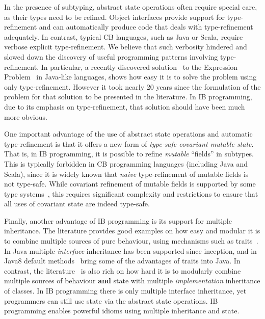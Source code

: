 In the presence of subtyping, abstract state operations often require
special care, as their types need to be refined. Object interfaces
provide support for type-refinement and can automatically produce code
that deals with type-refinement adequately. In contrast, typical CB
languages, such as Java or Scala, require verbose explicit
type-refinement. We believe that such verbosity hindered and slowed
down the discovery of useful programming patterns involving
type-refinement. In particular, a recently discovered
solution~\cite{eptrivially} to the Expression
Problem~\cite{wadler98expression} in Java-like languages, shows how easy it is to solve
the problem using only type-refinement. However it took nearly 20
years since the formulation of the problem for that
solution to be presented in the literature. In IB programming, due to
its emphasis on type-refinement, that solution should have been much
more obvious.

One important advantage of the use of abstract state operations and
automatic type-refinement is that it offers a new form of
\emph{type-safe covariant mutable state}. That is, in IB programming,
it is possible to refine \emph{mutable} ``fields'' in subtypes. This is
typically forbidden in CB programming languages (including Java and
Scala), since it is widely known that \emph{naive} type-refinement of
mutable fields is not type-safe. While covariant refinement of mutable
fields is supported by some type systems~\cite{bruce98astatically,McDirmid01jiazzi,ernst01family,ernst06virtual}, this requires
significant complexity and restrictions to ensure that all uses of
covariant state are indeed type-safe. 

\begin{comment}
\marcoT{%

In this paper we show how to support type-safe
\textbf{field removal},
\textbf{field type refinement} allowing a kind of covariant setters refinement,
and \textbf{multiple inheritance}.}
\end{comment}

Finally, another advantage of IB programming is its support for
multiple inheritance. The literature provides good examples on how
easy and modular it is to combine multiple sources of pure behaviour,
using mechanisms such as traits~\cite{scharli03traits}. In Java
multiple \emph{interface} inheritance has been supported since
inception, and in Java8 default methods~\cite{goetz12fdefenders} bring some of the
advantages of traits into Java. In contrast, the literature~\cite{Sak89dis,bracha90mixin,malayeri2009cz}
is also rich on how hard it is to modularly combine multiple sources
of behaviour \textbf{and} state with multiple \emph{implementation}
inheritance of classes. In IB programming there is only multiple
interface inheritance, yet programmers can still use state via the
abstract state operations. IB programming enables powerful 
idioms using multiple inheritance and state.

